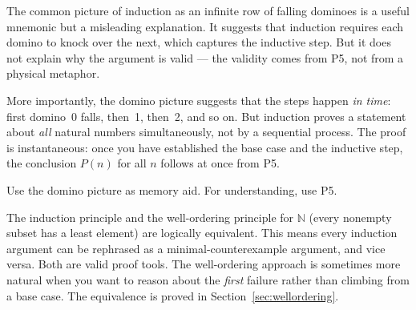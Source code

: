 \begin{remark}
The common picture of induction as an infinite row of falling dominoes
is a useful mnemonic but a misleading explanation. It suggests that
induction requires each domino to knock over the next, which captures
the inductive step. But it does not explain why the argument is valid ---
the validity comes from P5, not from a physical metaphor.

More importantly, the domino picture suggests that the steps happen
\emph{in time}: first domino~0 falls, then~1, then~2, and so on.
But induction proves a statement about \emph{all} natural numbers
simultaneously, not by a sequential process. The proof is instantaneous:
once you have established the base case and the inductive step, the
conclusion $P(n)$ for all $n$ follows at once from P5.

Use the domino picture as memory aid. For understanding, use P5.
\end{remark}

\begin{remark}
The induction principle and the well-ordering principle for $\mathbb{N}$
(every nonempty subset has a least element) are logically equivalent.
This means every induction argument can be rephrased as a
minimal-counterexample argument, and vice versa. Both are valid proof
tools. The well-ordering approach is sometimes more natural when you
want to reason about the \emph{first} failure rather than climbing
from a base case. The equivalence is proved in
Section~\ref{sec:wellordering}.
\end{remark}
